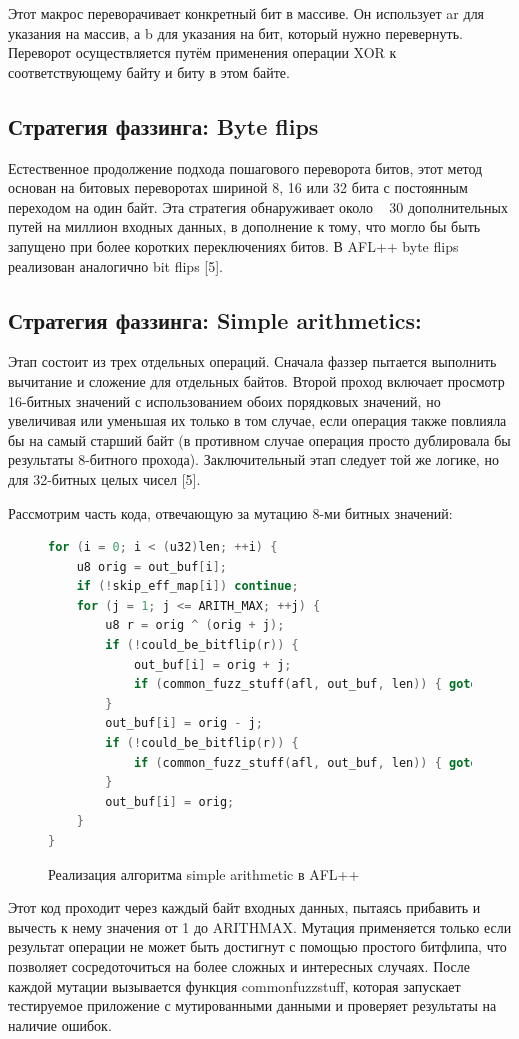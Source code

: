 Этот макрос переворачивает конкретный бит в массиве. Он использует \textunderscore ar для указания на массив, а \textunderscore b для указания на бит, который нужно перевернуть. Переворот осуществляется путём применения операции XOR к соответствующему байту и биту в этом байте.

\subsection{Стратегия фаззинга: Byte flips} \label{ch2:byte-flips}
Естественное продолжение подхода пошагового переворота битов, этот метод основан на битовых переворотах шириной 8, 16 или 32 бита с постоянным переходом на один байт. Эта стратегия обнаруживает около ~ 30 дополнительных путей на миллион входных данных, в дополнение к тому, что могло бы быть запущено при более коротких переключениях битов. В AFL++ byte flips реализован аналогично bit flips [5].

\subsection{Стратегия фаззинга: Simple arithmetics:} \label{ch2:simple-arithmetics}
Этап состоит из трех отдельных операций. Сначала фаззер пытается выполнить вычитание и сложение для отдельных байтов. Второй проход включает просмотр 16-битных значений с использованием обоих порядковых значений, но увеличивая или уменьшая их только в том случае, если операция также повлияла бы на самый старший байт (в противном случае операция просто дублировала бы результаты 8-битного прохода). Заключительный этап следует той же логике, но для 32-битных целых чисел [5].

Рассмотрим часть кода, отвечающую за мутацию 8-ми битных значений:

\begin{figure}[ht]
	\begin{lstlisting}[language=C]
	for (i = 0; i < (u32)len; ++i) {
	u8 orig = out_buf[i];
	if (!skip_eff_map[i]) continue;
	for (j = 1; j <= ARITH_MAX; ++j) {
		u8 r = orig ^ (orig + j);
		if (!could_be_bitflip(r)) {
			out_buf[i] = orig + j;
			if (common_fuzz_stuff(afl, out_buf, len)) { goto abandon_entry; }
		}
		out_buf[i] = orig - j;
		if (!could_be_bitflip(r)) {
			if (common_fuzz_stuff(afl, out_buf, len)) { goto abandon_entry; }
		}
		out_buf[i] = orig;
	}
}
	\end{lstlisting}
	\caption{Реализация алгоритма simple arithmetic в AFL++}\label{fig:simple-arithmetic}
\end{figure}
\newpage
Этот код проходит через каждый байт входных данных, пытаясь прибавить и вычесть к нему значения от 1 до ARITH\textunderscore MAX. Мутация применяется только если результат операции не может быть достигнут с помощью простого битфлипа, что позволяет сосредоточиться на более сложных и интересных случаях. После каждой мутации вызывается функция common\textunderscore fuzz\textunderscore stuff, которая запускает тестируемое приложение с мутированными данными и проверяет результаты на наличие ошибок.


